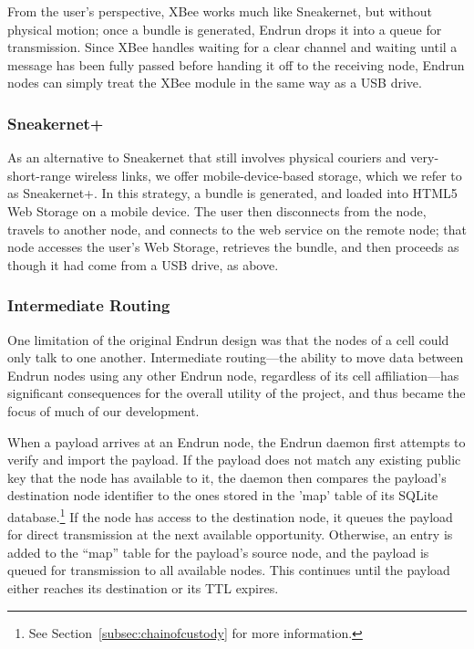 \documentclass[12pt]{article}
\begin{document}
  From the user's perspective, XBee works much like Sneakernet, but without physical motion; once a bundle is generated, Endrun drops it into a queue for transmission. Since XBee handles waiting for a clear channel and waiting until a message has been fully passed before handing it off to the receiving node, Endrun nodes can simply treat the XBee module in the same way as a USB drive.
  
  \subsubsection{Sneakernet+}
  
  As an alternative to Sneakernet that still involves physical couriers and very-short-range wireless links, we offer mobile-device-based storage, which we refer to as Sneakernet+. In this strategy, a bundle is generated, and loaded into HTML5 Web Storage on a mobile device. The user then disconnects from the node, travels to another node, and connects to the web service on the remote node; that node accesses the user's Web Storage, retrieves the bundle, and then proceeds as though it had come from a USB drive, as above.
  
  \subsubsection{Intermediate Routing}
  \label{subsec:introuting}

  One limitation of the original Endrun design was that the nodes of a cell could only talk to one another. Intermediate routing---the ability to move data between Endrun nodes using any other Endrun node, regardless of its cell affiliation---has significant consequences for the overall utility of the project, and thus became the focus of much of our development.
  
  When a payload arrives at an Endrun node, the Endrun daemon first attempts to verify and import the payload. If the payload does not match any existing public key that the node has available to it, the daemon then compares the payload's destination node identifier to the ones stored in the 'map' table of its SQLite database.\footnote{See Section~\ref{subsec:chainofcustody} for more information.} If the node has access to the destination node, it queues the payload for direct transmission at the next available opportunity. Otherwise, an entry is added to the ``map'' table for the payload's source node, and the payload is queued for transmission to all available nodes. This continues until the payload either reaches its destination or its TTL expires.
  
\end{document}
